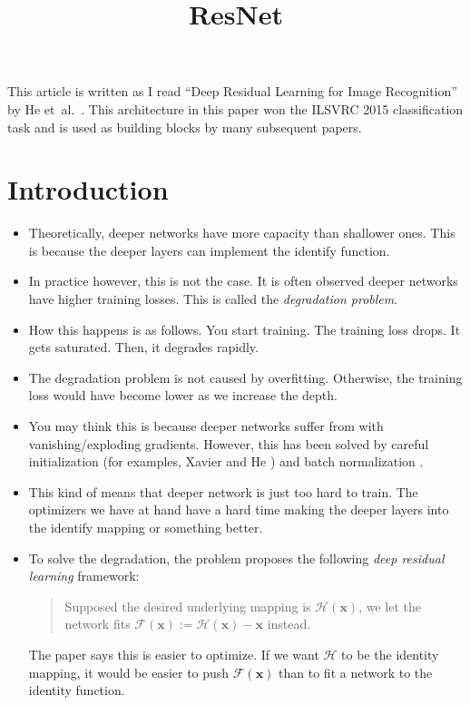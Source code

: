 \documentclass[10pt]{article}
\title{ResNet}
\newcommand{\ve}[1]{\mathbf{#1}}
\newcommand{\etal}{{et~al.}}
\begin{document}
  \maketitle

  This article is written as I read ``Deep Residual Learning for Image Recognition'' by He \etal\ \cite{He:2015}. This architecture in this paper won the ILSVRC 2015 classification task and is used as building blocks by many subsequent papers.

  \section{Introduction}

  \begin{itemize}
  	\item Theoretically, deeper networks have more capacity than shallower ones. This is because the deeper layers can implement the identify function.

  	\item In practice however, this is not the case. It is often observed deeper networks have higher training losses. This is called the \emph{degradation problem}.

  	\item How this happens is as follows. You start training. The training loss drops. It gets saturated. Then, it degrades rapidly.

 	\item The degradation problem is not caused by overfitting. Otherwise, the training loss would have become lower as we increase the depth.

  	\item You may think this is because deeper networks suffer from with vanishing/exploding gradients. However, this has been solved by careful initialization (for examples, Xavier \cite{Glorot:2010} and He \cite{HeInit:2015}) and batch normalization \cite{Ioffe:2015}.

  	\item This kind of means that deeper network is just too hard to train. The optimizers we have at hand have a hard time making the deeper layers into the identify mapping or something better.

  	\item To solve the degradation, the problem proposes the following \emph{deep residual learning} framework:
  	\begin{quote}
  		Supposed the desired underlying mapping is $\mathcal{H}(\ve{x})$, we let the network fits $\mathcal{F}(\ve{x}) := \mathcal{H}(\ve{x}) - \ve{x}$ instead.
  	\end{quote}
  	The paper says this is easier to optimize. If we want $\mathcal{H}$ to be the identity mapping, it would be easier to push $\mathcal{F}(\ve{x})$ than to fit a network to the identity function.


\end{itemize}
\end{document}
